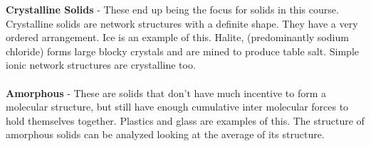 \documentclass{article}
\begin{document}
		\vspace{10pt}
		\noindent\textbf{Crystalline Solids} - These end up being the focus for solids in this course. Crystalline solids are network structures with a definite shape. They have a very ordered arrangement. Ice is an example of this. Halite, (predominantly sodium chloride) forms large blocky crystals and are mined to produce table salt. Simple ionic network structures are crystalline too.\\
		\\
		\textbf{Amorphous} - These are solids that don't have much incentive to form a molecular structure, but still have enough cumulative inter molecular forces to hold themselves together. Plastics and glass are examples of this. The structure of amorphous solids can be analyzed looking at the average of its structure.\\
		\\
		
\end{document}
